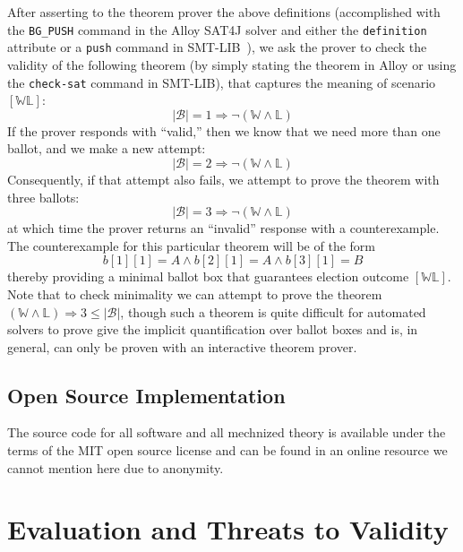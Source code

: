 \documentclass[runningheads,a4paper]{llncs}
\newcommand{\ballots}{\ensuremath{\mathcal{B}}\xspace}
\newcommand{\winner}{\ensuremath{\mathbb{W}}}
\newcommand{\loser}{\ensuremath{\mathbb{L}}}
\begin{document}
After asserting to the theorem prover the above definitions (accomplished
with the \texttt{BG\_PUSH} command in the Alloy SAT4J solver and either
the \texttt{definition} attribute or a \texttt{push} command in
SMT-LIB~\cite{DetlefsNelsonSaxe2005,SMT-LIB}), we ask the prover to
check the validity of the following theorem (by simply stating the
theorem in Alloy or using the \texttt{check-sat} command in
SMT-LIB), that captures the meaning of scenario $[\winner\loser]$:
\begin{equation*}
  |\ballots| = 1 \Rightarrow \neg(\winner \wedge \loser)
\end{equation*}
If the prover responds with ``valid,'' then we know that we need more
than one ballot, and we make a new attempt:
\begin{equation*}
  |\ballots| = 2 \Rightarrow \neg(\winner \wedge \loser)
\end{equation*}
Consequently, if that attempt also fails, we attempt to prove the
theorem with three ballots:
\begin{equation*}
  |\ballots| = 3 \Rightarrow \neg(\winner \wedge \loser)
\end{equation*}
at which time the prover returns an ``invalid'' response with a
counterexample.  The counterexample for this particular theorem will
be of the form
\begin{equation*}
  b[1][1] = A \wedge b[2][1] = A \wedge b[3][1] = B
\end{equation*}
thereby providing a minimal ballot box that guarantees election
outcome $[\winner\loser]$.  Note that to check minimality we can
attempt to prove the theorem $(\winner \wedge \loser) \Rightarrow 3
\leq |\ballots|$, though such a theorem is quite difficult for
automated solvers to prove give the implicit quantification over
ballot boxes and is, in general, can only be proven with an
interactive theorem prover.

\subsection{Open Source Implementation}

The source code for all software and all mechnized theory is available
under the terms of the MIT open source license and can be found in an
online resource we cannot mention here due to anonymity.

\section{Evaluation and Threats to Validity}
\end{document}
